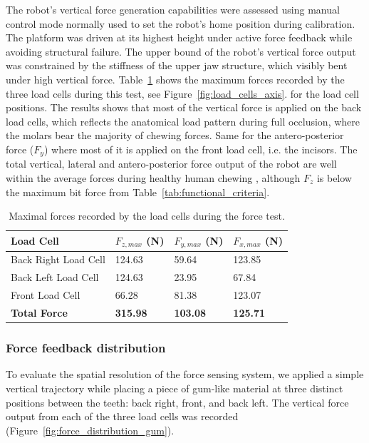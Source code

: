 The robot's vertical force generation capabilities were assessed using manual control mode normally used to set the robot's home position during calibration. 
The platform was driven at its highest height under active force feedback while avoiding structural failure. The upper bound of the robot's vertical force 
output was constrained by the stiffness of the upper jaw structure, which visibly bent under high vertical force. Table~\ref{tab:max_force} shows the 
maximum forces recorded by the three load cells during this test, see Figure~\ref{fig:load_cells_axis}.
for the load cell positions. The results shows that most of the vertical force is applied on the back load cells, which reflects the 
anatomical load pattern during full occlusion, where the molars bear the majority of chewing forces. Same for the antero-posterior force ($F_y$) where most of it 
is applied on the front load cell, i.e. the incisors. The total vertical, lateral and antero-posterior force output of the robot are well within the average 
forces during healthy human chewing \cite{shear_force}, although $F_z$ is below the maximum bit force from Table~\ref{tab:functional_criteria}.
\begin{table}[H]
    \centering
    \begin{tabular}{p{4cm} p{2cm} p{2cm} p{2cm}}
        \toprule
        \textbf{Load Cell} & \textbf{$F_{z,max}$ (N)} & \textbf{$F_{y,max}$ (N)} & \textbf{$F_{x,max}$ (N)} \\
        \midrule
        Back Right Load Cell & 124.63 & 59.64 & 123.85 \\
        Back Left Load Cell & 124.63 & 23.95 & 67.84  \\
        Front Load Cell & 66.28 & 81.38 & 123.07  \\
        \midrule
        \textbf{Total Force} & \textbf{315.98} & \textbf{103.08} & \textbf{125.71} \\
        \bottomrule       
    \end{tabular}
    \caption{Maximal forces recorded by the load cells during the force test.}
    \label{tab:max_force}
\end{table}

\subsubsection{Force feedback distribution}

To evaluate the spatial resolution of the force sensing system, we applied a simple vertical trajectory while placing a piece of gum-like material 
at three distinct positions between the teeth: back right, front, and back left. The vertical force output from each of the three load cells was 
recorded (Figure~\ref{fig:force_distribution_gum}).

